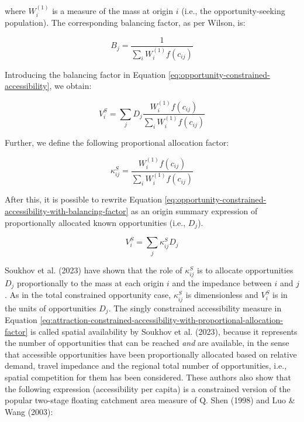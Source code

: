\documentclass[
11pt, %
oneside, %
english, %
singlespacing, %
]{macthesis} %
\begin{document}
\noindent where \(W_i^{(1)}\) is a measure of the mass at origin \(i\) (i.e., the opportunity-seeking population). The corresponding balancing factor, as per Wilson, is:

\begin{equation}
\label{eq:opportunity-constrained-proportionality-constants}
B_j = \frac{1}{\sum_i W_i^{(1)} f(c_{ij})}
\end{equation} 

Introducing the balancing factor in Equation \ref{eq:opportunity-constrained-accessibility}, we obtain:

\begin{equation}
\label{eq:opportunity-constrained-accessibility-with-balancing-factor}
V^S_{i} = \sum_j D_j \frac{W_i^{(1)} f(c_{ij})}{\sum_i W_i^{(1)} f(c_{ij})}
\end{equation} 

Further, we define the following proportional allocation factor:

\begin{equation}
\label{eq:opportunity-constrained-proportional-allocation-factor}
\kappa^S_{ij} = \frac{W_i^{(1)} f(c_{ij})}{\sum_i W_i^{(1)} f(c_{ij})}
\end{equation} 

After this, it is possible to rewrite Equation \ref{eq:opportunity-constrained-accessibility-with-balancing-factor} as an origin summary expression of proportionally allocated known opportunities (i.e., \(D_j\)).

\begin{equation}
\label{eq:attraction-constrained-accessibility-with-proportional-allocation-factor}
V^S_{i} = \sum_j \kappa^S_{ij} D_j
\end{equation} 

Soukhov et al. (2023) have shown that the role of \(\kappa^S_{ij}\) is to allocate opportunities \(D_j\) proportionally to the mass at each origin \(i\) and the impedance between \(i\) and \(j\). As in the total constrained opportunity case, \(\kappa^S_{ij}\) is dimensionless and \(V_i^S\) is in the units of opportunities \(D_j\). The singly constrained accessibility measure in Equation \ref{eq:attraction-constrained-accessibility-with-proportional-allocation-factor} is called spatial availability by Soukhov et al. (2023), because it represents the number of opportunities that can be reached \emph{and} are available, in the sense that accessible opportunities have been proportionally allocated based on relative demand, travel impedance and the regional total number of opportunities, i.e., spatial competition for them has been considered. These authors also show that the following expression (accessibility per capita) is a constrained version of the popular two-stage floating catchment area measure of Q. Shen (1998) and Luo \& Wang (2003):
\end{document}
